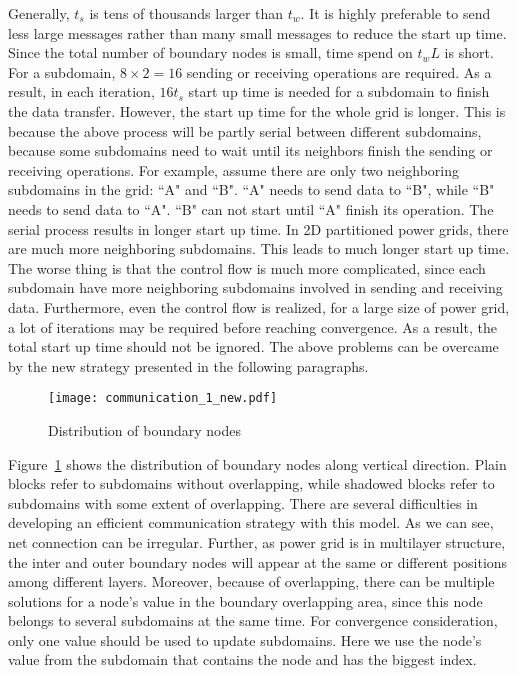 \documentclass{sig-alternate}
\begin{document}
	Generally, $t_s$ is tens of thousands larger than $t_w$. It is highly preferable to send less 
	large messages rather than many small messages to reduce the start up time. Since the total number of boundary nodes is small, 
	time spend on $t_wL$ is short. For a subdomain, $8\times 2 = 
	16$ sending or receiving operations are required. As a result, in each iteration, $16t_s$ start up time is
	needed for a subdomain to finish the data transfer. However, the start up time for the whole grid is longer.
	This is because the above process will be partly serial between different subdomains, because some subdomains need to wait until
	its neighbors finish the sending or receiving operations. For example, 
	assume there are only two neighboring subdomains in the grid: ``A" and ``B". ``A" needs to send data to ``B", while ``B" needs
	to send data to ``A". ``B" can not start until ``A" finish its operation. The serial process results in 
	longer start up time. In 2D partitioned power grids, there are much more neighboring subdomains. This leads to much 
	longer start up time. The worse thing is that the control flow is much more complicated, since each subdomain have more 
	neighboring subdomains involved in sending and receiving data. Furthermore, even the control flow is realized, for a large size of
	power grid, a lot of iterations may be required before reaching convergence. As a result, the total start up time should not be 
	ignored. The above problems can be overcame by the new strategy presented in the following paragraphs.

	\begin{figure}[htbp]
	  \centering
	  \texttt{[image: communication\_1\_new.pdf]}
	  \caption{Distribution of boundary nodes}
	  \label{comm}
	\end{figure}

	Figure~\ref{comm} shows the distribution of boundary nodes along vertical direction. Plain blocks refer to subdomains without 
	overlapping, while shadowed blocks refer to subdomains with some extent of overlapping. There are several difficulties in 
	developing an efficient communication strategy with this model. As we can see, net connection can be irregular. Further, 
	as power grid is in multilayer 
	structure, the inter and outer boundary nodes will appear at the same or different positions
	among different layers. Moreover, because of overlapping, there can be multiple solutions for a node's value in the boundary 
	overlapping area, since this node belongs to several subdomains at the same time. For convergence consideration, only one value 
	should be used to update subdomains. Here we use the node's value from the subdomain that contains the node and has the biggest 
	index.
\end{document}
